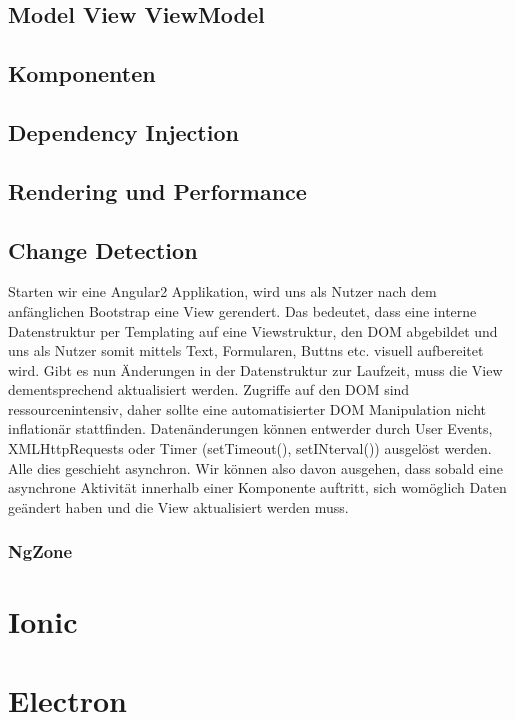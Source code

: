 \subsection{Model View ViewModel}
\subsection{Komponenten}
\subsection{Dependency Injection}
\subsection{Rendering und Performance}

\subsection{Change Detection}


Starten wir eine Angular2 Applikation, wird uns als Nutzer nach dem anfänglichen Bootstrap eine View gerendert.
Das bedeutet, dass eine interne Datenstruktur per Templating auf eine Viewstruktur, den DOM abgebildet und uns als Nutzer somit mittels Text,
Formularen, Buttns etc. visuell aufbereitet wird.
Gibt es nun Änderungen in der Datenstruktur zur Laufzeit, muss die View dementsprechend aktualisiert werden.
Zugriffe auf den DOM sind ressourcenintensiv, daher sollte eine automatisierter DOM Manipulation nicht inflationär stattfinden.
Datenänderungen können entwerder durch User Events, XMLHttpRequests oder Timer (setTimeout(), setINterval()) ausgelöst werden.
Alle dies geschieht asynchron. Wir können also davon ausgehen, dass sobald eine asynchrone Aktivität innerhalb einer Komponente auftritt, sich womöglich Daten geändert haben und
die View aktualisiert werden muss.
\cite{change-detection-explained}

\subsubsection{NgZone}




\section{Ionic}
\section{Electron}
